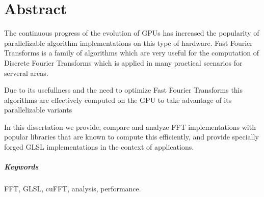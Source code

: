 \documentclass[
  oneside,
  11pt, a4paper,
  footinclude=true,
  headinclude=true,
  cleardoublepage=empty
]{scrbook}
\begin{document}

    




\chapter*{Abstract}

The continuous progress of the evolution of GPUs has increased the popularity of parallelizable algorithm implementations on this type of hardware.
Fast Fourier Transforms is a family of algorithms which are very useful for the computation of Discrete Fourier Transforms which is applied in many practical scenarios for serveral areas.

Due to its usefullness and the need to optimize Fast Fourier Transforms this algorithms are effectively computed on the GPU to take advantage of its parallelizable variants

In this dissertation we provide, compare and analyze FFT implementations with popular libraries that are known to compute this efficiently, and provide specially forged GLSL implementations in the context of applications.

\paragraph{Keywords} FFT, GLSL, cuFFT, analysis, performance.
\end{document}
